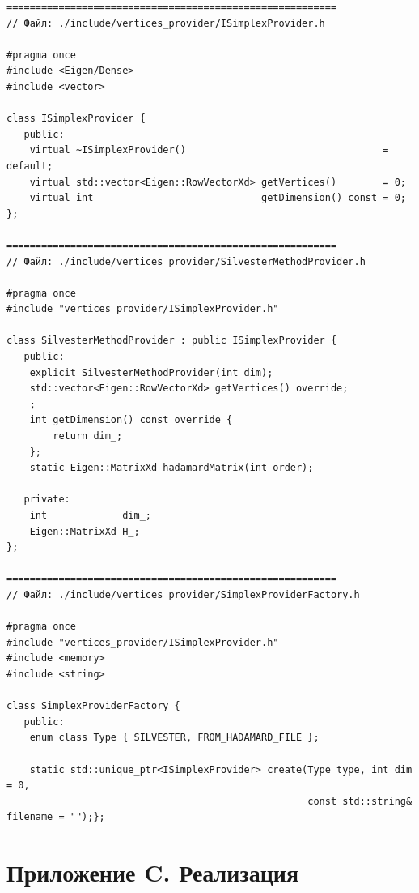 \documentclass[a4paper,12pt]{article}
\theoremstyle{indented}
\begin{document}
\begin{lstlisting}
=========================================================
// Файл: ./include/vertices_provider/ISimplexProvider.h

#pragma once
#include <Eigen/Dense>
#include <vector>

class ISimplexProvider {
   public:
    virtual ~ISimplexProvider()                                  = default;
    virtual std::vector<Eigen::RowVectorXd> getVertices()        = 0;
    virtual int                             getDimension() const = 0;
};

=========================================================
// Файл: ./include/vertices_provider/SilvesterMethodProvider.h

#pragma once
#include "vertices_provider/ISimplexProvider.h"

class SilvesterMethodProvider : public ISimplexProvider {
   public:
    explicit SilvesterMethodProvider(int dim);
    std::vector<Eigen::RowVectorXd> getVertices() override;
    ;
    int getDimension() const override {
        return dim_;
    };
    static Eigen::MatrixXd hadamardMatrix(int order);

   private:
    int             dim_;
    Eigen::MatrixXd H_;
};

=========================================================
// Файл: ./include/vertices_provider/SimplexProviderFactory.h

#pragma once
#include "vertices_provider/ISimplexProvider.h"
#include <memory>
#include <string>

class SimplexProviderFactory {
   public:
    enum class Type { SILVESTER, FROM_HADAMARD_FILE };

    static std::unique_ptr<ISimplexProvider> create(Type type, int dim = 0,
                                                    const std::string& filename = "");};
\end{lstlisting}

\newpage

\section*{Приложение C. Реализация}
\end{document}

